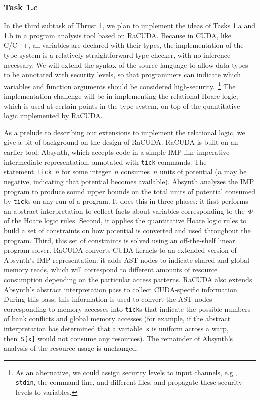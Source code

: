 \subsubsection{Task 1.c}
In the third subtask of Thrust 1, we plan to implement the ideas of Tasks 1.a
and 1.b in a program analysis tool based on RaCUDA.
%
Because in CUDA, like C/C++, all variables are declared with their types, the
implementation of the type system is a relatively straightforward type checker,
with no inference necessary.
%
We will extend the syntax of the source language
to allow data types to be annotated with
security levels, so that programmers can indicate which variables and
function arguments should be considered high-security.~\footnote{As an
alternative, we could assign security levels to input channels, e.g.,
\texttt{stdin}, the command line, and different files, and propagate these
security levels to variables.}
%
The implementation challenge will be in implementing the relational
Hoare logic, which is used at certain points in the type system, on top of
the quantitative logic implemented by RaCUDA.

As a prelude to describing our extensions to implement the relational logic,
we give a bit of background on the design of RaCUDA.
%
RaCUDA is built on an earlier tool, Absynth, which accepts code in a simple
IMP-like imperative intermediate representation, annotated with \texttt{tick}
commands.
%
The statement~\texttt{tick}~$n$ for some integer~$n$ consumes~$n$ units of
potential ($n$ may be negative, indicating that potential becomes available).
%
Absynth analyzes the IMP program to produce sound upper bounds on the total
units of potential consumed by \texttt{tick}s on any run of a program.
%
It does this in three phases: it first performs an abstract interpretation
to collect facts about variables corresponding to the~$\Phi$ of the Hoare
logic rules.
%
Second, it applies the quantitative Hoare logic rules to build a set of
constraints on how potential is converted and used throughout the program.
%
Third, this set of constraints is solved using an off-the-shelf linear
program solver.
%
RaCUDA converts CUDA kernels to an extended version of Absynth's IMP
representation: it adds AST nodes to indicate shared and global memory
reads, which will correspond to different amounts of resource consumption
depending on the particular access patterns.
%
RaCUDA also extends Absynth's abstract interpretation pass to collect
CUDA-specific information.
%
During this pass, this information is used to convert the AST nodes
corresponding to memory accesses into \texttt{tick}s that indicate the
possible numbers of bank conflicts and global memory accesses (for example,
if the abstract interpretation has determined that a variable~\texttt{x} is
uniform across a warp, then~\texttt{S[x]} would not consume any resources).
%
The remainder of Absynth's analysis of the resource usage is unchanged.

